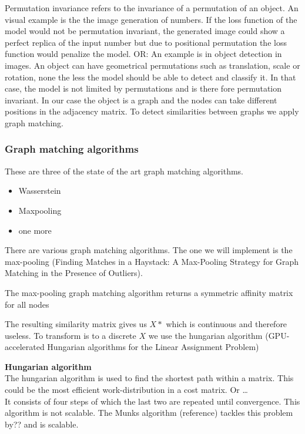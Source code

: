 Permutation invariance refers to the invariance of a permutation of an object. An visual example is the the image generation of numbers. If the loss function of the model would not be permutation invariant, the generated image could show a perfect replica of the input number but due to positional permutation the loss function would penalize the model. 
OR: An example is in object detection in images. An object can have geometrical permutations such as translation, scale or rotation, none the less the model should be able to detect and classify it. In that case, the model is not limited by permutations and  is there fore permutation invariant.
In our case the object is a graph and the nodes can take different positions in the adjacency matrix. To detect similarities between graphs we apply graph matching.

\subsubsection{Graph matching algorithms}
These are three of the state of the art graph matching algorithms.

\begin{itemize}
    \item Wasserstein
    \item Maxpooling
    \item one more
\end{itemize}

There are various graph matching algorithms. The one we will implement is the max-pooling (Finding Matches in a Haystack: A Max-Pooling Strategy for Graph Matching in the Presence of Outliers). 

The max-pooling graph matching algorithm returns a symmetric affinity matrix for all nodes

The resulting similarity matrix gives us $X*$ which is continuous and therefore useless. To transform is to a discrete $X$ we use the hungarian algorithm (GPU-accelerated Hungarian algorithms for the Linear
Assignment Problem)

\textbf{Hungarian algorithm}\\
The hungarian algorithm is used to find the shortest path within a matrix. This could be the most efficient work-distribution in a cost matrix. Or \dots \\
It consists of four steps of which the last two are repeated until convergence. This algorithm is not scalable. The Munks algorithm (reference) tackles this problem by?? and is scalable.

